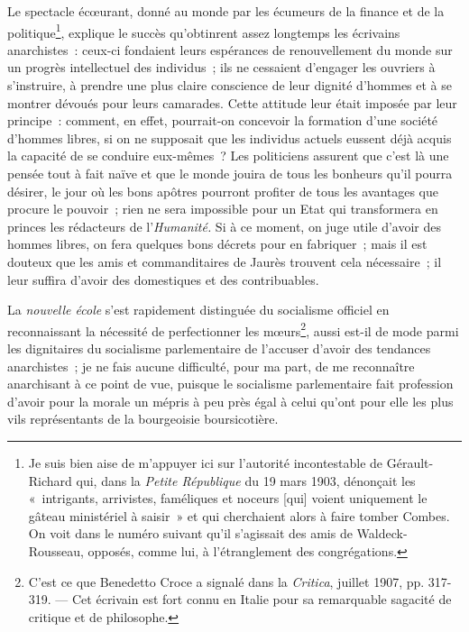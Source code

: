 \documentclass[french,twoside]{book} %
\begin{document}
Le spectacle écœurant, donné au monde par les écumeurs de la finance et de la politique\footnote{ \noindent Je suis bien aise de m’appuyer ici sur l’autorité incontestable de Gérault-Richard qui, dans la \emph{Petite République} du 19 mars 1903, dénonçait les « intrigants, arrivistes, faméliques et noceurs [qui] voient uniquement le gâteau ministériel à saisir » et qui cherchaient alors à faire tomber Combes. On voit dans le numéro suivant qu’il s’agissait des amis de Waldeck-Rousseau, opposés, comme lui, à l’étranglement des congrégations.
 }, explique le  succès qu’obtinrent assez longtemps les écrivains anarchistes : ceux-ci fondaient leurs espérances de renouvellement du monde sur un progrès intellectuel des individus ; ils ne cessaient d’engager les ouvriers à s’instruire, à prendre une plus claire conscience de leur dignité d’hommes et à se montrer dévoués pour leurs camarades. Cette attitude leur était imposée par leur principe : comment, en effet, pourrait-on concevoir la formation d’une société d’hommes libres, si on ne supposait que les individus actuels eussent déjà acquis la capacité de se conduire eux-mêmes ? Les politiciens assurent que c’est là une pensée tout à fait naïve et que le monde jouira de tous les bonheurs qu’il pourra désirer, le jour où les bons apôtres pourront profiter de tous les avantages que procure le pouvoir ; rien ne sera impossible pour un Etat qui transformera en princes les rédacteurs de l’\emph{Humanité.} Si à ce moment, on juge utile d’avoir des hommes libres, on fera quelques bons décrets pour en fabriquer ; mais il est douteux que les amis et commanditaires de Jaurès trouvent cela nécessaire ; il leur suffira d’avoir des domestiques et des contribuables.\par
La \emph{nouvelle école} s’est rapidement distinguée du socialisme officiel en reconnaissant la nécessité de perfectionner les mœurs\footnote{ \noindent C’est ce que Benedetto Croce a signalé dans la \emph{Critica}, juillet 1907, pp. 317-319. — Cet écrivain est fort connu en Italie pour sa remarquable sagacité de critique et de philosophe.
 }, aussi est-il de mode parmi les  dignitaires du socialisme parlementaire de l’accuser d’avoir des tendances anarchistes ; je ne fais aucune difficulté, pour ma part, de me reconnaître anarchisant à ce point de vue, puisque le socialisme parlementaire fait profession d’avoir pour la morale un mépris à peu près égal à celui qu’ont pour elle les plus vils représentants de la bourgeoisie boursicotière.\par
\end{document}
